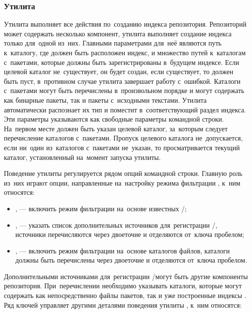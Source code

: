\subsubsection{Утилита }

Утилита  выполняет все действия по~созданию индекса репозитория.
Репозиторий может содержать несколько компонент, утилита  выполняет создание индекса только для~одной из~них.
Главными параметрами для~неё являются путь к~каталогу, где должен быть расположен индекс,
и множество путей к~каталогам с~пакетами, которые должны быть зарегистрированы в~будущем индексе.
Если целевой каталог не~существует, он будет создан, 
если существует, то должен быть пуст, в~противном случае утилита завершает работу с~ошибкой. 
Каталоги с~пакетами могут быть перечислены в~произвольном порядке и могут содержать как бинарные пакеты, так и пакеты  с~исходными текстами.
Утилита  автоматически распознает их тип и поместит в~соответствующий раздел индекса.
Эти параметры указываются как свободные параметры командной строки.
На~первом месте должен быть указан целевой каталог, за~которым следует перечисление каталогов с~пакетами.
Пропуск целевого каталога не~допускается, если ни~один из~каталогов с~пакетами не~указан, то просматривается текущий каталог, установленный на~момент запуска утилиты.

Поведение утилиты регулируется рядом опций командной строки.
Главную роль из~них играют опции, направленные на~настройку режима фильтрации \provides, к~ним относятся:

\begin{itemize}

\item{
,  --- включить режим фильтрации \provides на~основе известных \requires/\conflicts; %
}

\item {
,  --- указать список дополнительных источников для~регистрации \requires/\conflicts, 
источники перечисляются через двоеточие и отделяются от~ключа пробелом;
}

\item {
,  --- включить режим фильтрации \provides на~основе каталогов файлов,
каталоги должны быть перечислены через двоеточие и отделяются от~ключа пробелом.
}

\end{itemize}

Дополнительными источниками  для~регистрации \requires/\conflicts могут быть другие компоненты репозитория.
При~перечислении необходимо указывать каталоги, которые могут содержать как непосредственно файлы пакетов, так и уже построенные индексы \ds.
Ряд ключей управляет другими деталями поведения утилиты , к~ним относятся:

